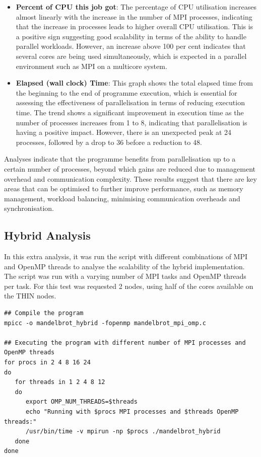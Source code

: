 \documentclass[
]{article}
\begin{document}
\begin{itemize}
\item
  \textbf{Percent of CPU this job got}: The percentage of CPU
  utilisation increases almost linearly with the increase in the number
  of MPI processes, indicating that the increase in processes leads to
  higher overall CPU utilisation. This is a positive sign suggesting
  good scalability in terms of the ability to handle parallel workloads.
  However, an increase above 100 per cent indicates that several cores
  are being used simultaneously, which is expected in a parallel
  environment such as MPI on a multicore system.
\item
  \textbf{Elapsed (wall clock) Time}: This graph shows the total elapsed
  time from the beginning to the end of programme execution, which is
  essential for assessing the effectiveness of parallelisation in terms
  of reducing execution time. The trend shows a significant improvement
  in execution time as the number of processes increases from 1 to 8,
  indicating that parallelisation is having a positive impact. However,
  there is an unexpected peak at 24 processes, followed by a drop to 36
  before a reduction to 48.
\end{itemize}

Analyses indicate that the programme benefits from parallelisation up to
a certain number of processes, beyond which gains are reduced due to
management overhead and communication complexity. These results suggest
that there are key areas that can be optimised to further improve
performance, such as memory management, workload balancing, minimising
communication overheads and synchronisation.

\subsection{Hybrid Analysis}\label{hybrid-analysis}

In this extra analysis, it was run the script with different
combinations of MPI and OpenMP threads to analyse the scalability of the
hybrid implementation. The script was run with a varying number of MPI
tasks and OpenMP threads per task. For this test was requested 2 nodes,
using half of the cores available on the THIN nodes.

\begin{verbatim}
## Compile the program
mpicc -o mandelbrot_hybrid -fopenmp mandelbrot_mpi_omp.c

## Executing the program with different number of MPI processes and OpenMP threads
for procs in 2 4 8 16 24
do
   for threads in 1 2 4 8 12
   do
      export OMP_NUM_THREADS=$threads
      echo "Running with $procs MPI processes and $threads OpenMP threads:"
      /usr/bin/time -v mpirun -np $procs ./mandelbrot_hybrid
   done
done
\end{verbatim}
\end{document}
